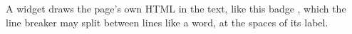 A widget draws the page's own HTML in the text, like this badge
, which the line breaker may split between lines like a
word, at the spaces of its label.
